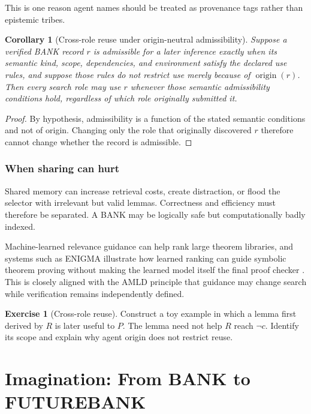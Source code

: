 \documentclass[11pt,openany]{book}
\newtheorem{corollary}[theorem]{Corollary}
\theoremstyle{definition}
\newtheorem{exercise}[theorem]{Exercise}
\theoremstyle{remark}
\begin{document}
This is one reason agent names should be treated as provenance tags rather than epistemic tribes.

\begin{corollary}[Cross-role reuse under origin-neutral admissibility]\label{cor:crossreuse}
Suppose a verified BANK record $r$ is admissible for a later inference exactly when its semantic kind, scope, dependencies, and environment satisfy the declared use rules, and suppose those rules do not restrict use merely because of $\operatorname{origin}(r)$. Then every search role may use $r$ whenever those semantic admissibility conditions hold, regardless of which role originally submitted it.
\end{corollary}
\begin{proof}
By hypothesis, admissibility is a function of the stated semantic conditions and not of origin. Changing only the role that originally discovered $r$ therefore cannot change whether the record is admissible.
\end{proof}


\section{When sharing can hurt}
Shared memory can increase retrieval costs, create distraction, or flood the selector with irrelevant but valid lemmas. Correctness and efficiency must therefore be separated. A BANK may be logically safe but computationally badly indexed.

Machine-learned relevance guidance can help rank large theorem libraries, and systems such as ENIGMA illustrate how learned ranking can guide symbolic theorem proving without making the learned model itself the final proof checker \cite{ENIGMA2017}. This is closely aligned with the AMLD principle that guidance may change search while verification remains independently defined.

\begin{exercise}[Cross-role reuse]\label{ex:cross}
Construct a toy example in which a lemma first derived by $R$ is later useful to $P$. The lemma need not help $R$ reach $\neg c$. Identify its scope and explain why agent origin does not restrict reuse.
\end{exercise}

\part{Imagination: From BANK to FUTUREBANK}
\end{document}
